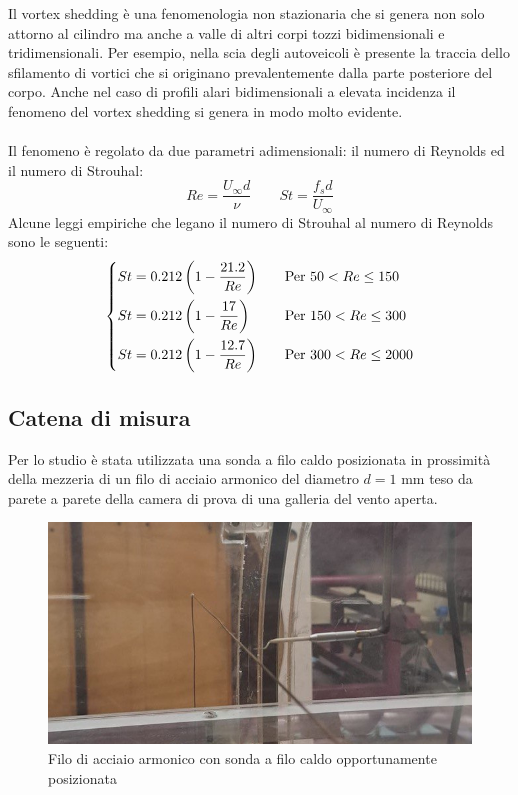 \noindent Il vortex shedding è una fenomenologia non stazionaria che si genera non solo attorno al cilindro ma anche a valle di altri corpi tozzi bidimensionali e tridimensionali. Per esempio, nella scia degli autoveicoli è presente la traccia dello sfilamento di vortici che si originano prevalentemente dalla parte posteriore del corpo. Anche nel caso di profili alari bidimensionali a elevata incidenza il fenomeno del vortex shedding si genera in modo molto evidente.\\\\
Il fenomeno è regolato da due parametri adimensionali: il numero di Reynolds ed il numero di Strouhal:
\begin{equation*}
    Re = \frac{U_\infty d}{\nu} \qquad St = \frac{f_s d}{U_\infty}
\end{equation*}
Alcune leggi empiriche che legano il numero di Strouhal al numero di Reynolds sono le seguenti:
\begin{equation*}
    \begin{dcases}
        St = 0.212\left(1-\frac{21.2}{Re}\right) \quad &\text{Per } 50<Re\le150\\
        St = 0.212\left(1-\frac{17}{Re}\right) \quad &\text{Per } 150<Re\le300\\
        St = 0.212\left(1-\frac{12.7}{Re}\right) \quad &\text{Per } 300<Re\le2000
    \end{dcases}
\end{equation*}

\subsection{Catena di misura}
Per lo studio è stata utilizzata una sonda a filo caldo posizionata in prossimità della mezzeria di un filo di acciaio armonico del diametro $d=1$ mm teso da parete a parete della camera di prova di una galleria del vento aperta.
\begin{figure}[H]
    \centering
    \includegraphics[width=.7\textwidth]{images/10/filo.jpg}
    \caption{Filo di acciaio armonico con sonda a filo caldo opportunamente posizionata}
\end{figure}

